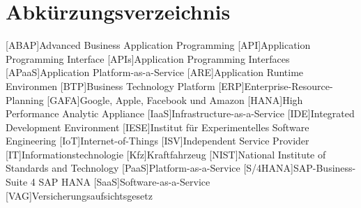 \clearpage
\chapter*{Abkürzungsverzeichnis}	

\begin{acronym}[XXXXXXX]
	[ABAP]{Advanced Business Application Programming}
	[API]{Application Programming Interface}
	[APIs]{Application Programming Interfaces}
	[APaaS]{Application Platform-as-a-Service}
	[ARE]{Application Runtime Environmen}
	[BTP]{Business Technology Platform}
	[ERP]{Enterprise-Resource-Planning}
	[GAFA]{Google, Apple, Facebook und Amazon}
	[HANA]{High Performance Analytic Appliance}
	[IaaS]{Infrastructure-as-a-Service}
	[IDE]{Integrated Development Environment}
	[IESE]{Institut für Experimentelles Software Engineering}
	[IoT]{Internet-of-Things}
	[ISV]{Independent Service Provider}
	[IT]{Informationstechnologie}
	[Kfz]{Kraftfahrzeug}
	[NIST]{National Institute of Standards and Technology}
	[PaaS]{Platform-as-a-Service}
	[S/4HANA]{SAP-Business-Suite 4 SAP HANA}
	[SaaS]{Software-as-a-Service}
	[VAG]{Versicherungsaufsichtsgesetz}
\end{acronym}